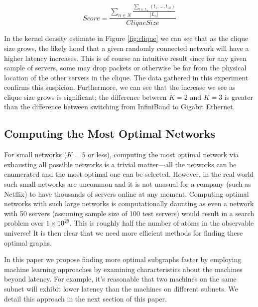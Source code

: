 \begin{equation}
  Score = \frac{\sum_{n \in N}\frac{\sum_{l \in L_n}(l_1, \ldots , l_{10})}{|L_n|}}{Clique Size}
  \label{eq:score}
\end{equation}

In the kernel density estimate in Figure \ref{fig:clique} we can see that as the clique size grows, the likely hood that a given randomly connected network will have a higher latency increases. This is of course an intuitive result since for any given sample of servers, some may drop packets or otherwise be far from the physical location of the other servers in the clique. The data gathered in this experiment confirms this suspicion. Furthermore, we can see that the increase we see as clique size grows is significant; the difference between $K=2$ and $K=3$ is greater than the difference between switching from InfiniBand to Gigabit Ethernet. 


\subsection{Computing the Most Optimal Networks}

For small networks ($K=5$ or less), computing the most optimal network via exhausting all possible networks is a trivial matter---all the networks can be enumerated and the most optimal one can be selected. However, in the real world such small networks are uncommon and it is not unusual for a company (such as Netflix) to have thousands of servers online at any moment. Computing optimal networks with such large networks is computationally daunting as even a network with 50 servers (assuming sample size of 100 test servers) would result in a search problem over $1 \times 10^{29}$. This is roughly half the number of atoms in the observable universe! It is then clear that we need more efficient methods for finding these optimal graphs.

In this paper we propose finding more optimal subgraphs faster by employing machine learning approaches by examining characteristics about the machines beyond latency. For example, it's reasonable that two machines on the same subnet will exhibit lower latency than the machines on different subnets. We detail this approach in the next section of this paper. 



